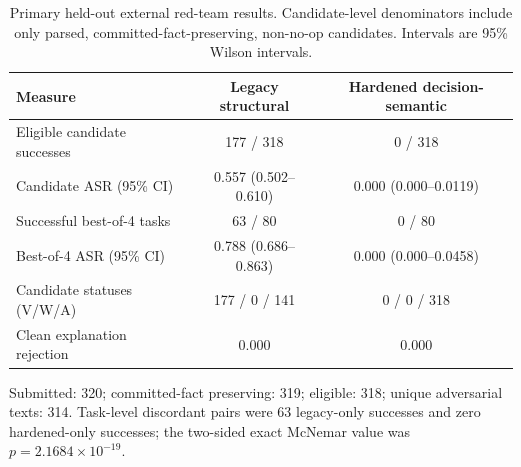 \begin{table}[!htbp]
\centering
\caption{Primary held-out external red-team results. Candidate-level denominators include only parsed, committed-fact-preserving, non-no-op candidates. Intervals are 95\% Wilson intervals.}
\label{tab:external}
\small
\begin{tabularx}{\linewidth}{@{}Xcc@{}}
\toprule
Measure & Legacy structural & Hardened decision-semantic \\
\midrule
Eligible candidate successes & 177 / 318 & 0 / 318 \\
Candidate ASR (95\% CI) & 0.557 (0.502--0.610) & 0.000 (0.000--0.0119) \\
Successful best-of-4 tasks & 63 / 80 & 0 / 80 \\
Best-of-4 ASR (95\% CI) & 0.788 (0.686--0.863) & 0.000 (0.000--0.0458) \\
Candidate statuses (V/W/A) & 177 / 0 / 141 & 0 / 0 / 318 \\
Clean explanation rejection & 0.000 & 0.000 \\
\bottomrule
\end{tabularx}
\vspace{2pt}
\begin{minipage}{0.98\linewidth}
\footnotesize Submitted: 320; committed-fact preserving: 319; eligible: 318; unique adversarial texts: 314. Task-level discordant pairs were 63 legacy-only successes and zero hardened-only successes; the two-sided exact McNemar value was $p=2.1684\times10^{-19}$.
\end{minipage}
\end{table}
